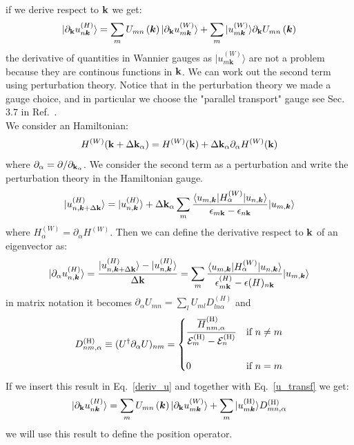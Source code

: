 \documentclass[preprint,showpacs,prb,superscriptaddress,aps,floatfix]{revtex4-1}
\newcommand{\kk}{{\bf k}}
\newcommand{\be}{\begin{equation}}
\newcommand{\ee}{\end{equation}}
\renewcommand{\[}{\left[}
\renewcommand{\]}{\right]}
\renewcommand{\(}{\left(}
\renewcommand{\)}{\right)}
\def\ket#1{\vert#1\rangle}
\def\bra#1{\langle#1\vert}
\def\ph{^{({\rm H})}}
\def\D{{D}\ph}
\begin{document}
if we derive respect to $\kk$ we get:
\begin{equation}
	\ket{ \partial_{\kk} u_{n\boldsymbol{k}}^{\left(H\right)}}=\sum_{m}U_{mn}\left(\boldsymbol{k}\right)\ket{\partial_{\kk} u_{m\boldsymbol{k}}^{\left(W\right)}} + \sum_{m}\ket{u_{m\boldsymbol{k}}^{\left(W\right)}} \partial_\kk U_{mn}\left(\boldsymbol{k}\right)
	\label{deriv_u}
\end{equation}
the derivative of quantities in Wannier gauges as $\ket{u_{m\boldsymbol{k}}^{\left(W\right)}}$ are not a problem because they are continous functions in $\kk$. We can work out the second term using perturbation theory.\cite{wang2006ab} 
Notice that in the perturbation theory we made a gauge choice, and in particular we choose the "parallel transport" gauge see Sec.~$3.7$ in Ref.~. \\
We consider an Hamiltonian:
\be
H^{(W)} (\kk + \Delta \kk_\alpha) = H^{(W)} (\kk)  + \Delta \kk_\alpha \partial_\alpha  H^{(W)} (\kk)
\ee
where $\partial_\alpha = \partial/\partial_{\kk_\alpha}$. We consider the second term as a perturbation and write the perturbation theory in the Hamiltonian gauge.
\be
	\ket{ u_{n,\boldsymbol{k}+\Delta \kk}^{\left(H\right)}}=\ket{ u_{n,\boldsymbol{k}}^{\left(H\right)}}+\Delta \kk_\alpha \sum_{m} \frac{\bra{u_{m,\boldsymbol{k} }} H^{(W)}_\alpha   \ket{u_{n,\boldsymbol{k} }}}{\epsilon_{m\kk}-\epsilon_{n\kk}} \ket{u_{m,\boldsymbol{k} }}
\ee
where $ H^{(W)}_\alpha =\partial_\alpha  H^{(W)}$. Then we can define the derivative respect to $\kk$ of an eigenvector as:
\be
\ket{ \partial_\alpha u_{n,\boldsymbol{k}}^{\left(H\right)}}=	\frac{\ket{ u_{n,\boldsymbol{k}+\Delta \kk}^{\left(H\right)}}-\ket{ u_{n,\boldsymbol{k}}^{\left(H\right)}}}{\Delta \kk}= \sum_{m} \frac{\bra{u_{m,\boldsymbol{k} }} H^{(W)}_\alpha   \ket{u_{n,\boldsymbol{k} }}}{\epsilon^{(H)}_{m\kk}-\epsilon(H)_{n\kk}} \ket{u_{m,\boldsymbol{k} }}
\ee
in matrix notation it becomes $ \partial_\alpha U_{mn} = \sum_l U_{ml} D^{(H)}_{ln\alpha}$ and
\begin{equation}
\D_{nm,\alpha}\equiv (U^{\dagger}
\partial_{\alpha}U)_{nm}=
\begin{cases}
  \displaystyle
  \frac{\overline H_{nm,\alpha}^{(\rm H)}}{{\cal E}^{(\rm H)}_{m}
  -{\cal E}_{n}^{(\rm H)}}& \text{if $n\not= m$}\\ \\
  0& \text{if $n=m$}
\end{cases}
\label{eq:ddef}
\end{equation}
If we insert this result in Eq.~\ref{deriv_u} and together with Eq.~\ref{u_transf} we get:
\begin{equation}
	\ket{ \partial_{\kk} u_{n\boldsymbol{k}}^{\left(H\right)}}=\sum_{m}U_{mn}\left(\boldsymbol{k}\right)\ket{\partial_{\kk} u_{m\boldsymbol{k}}^{\left(W\right)}} + \sum_{m}\ket{u_{m\boldsymbol{k}}\ph} \D_{mn,\alpha}
	\label{deriv_uh}
\end{equation}
we will use this result to define the position operator.
\end{document}
